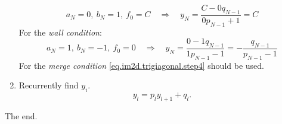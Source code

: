 \documentclass[a4paper,10pt]{article}
\begin{document}
\begin{enumerate}
\begin{equation}
        a_N = 0,\ b_N = 1,\ f_0 = C
        \quad\Rightarrow\quad
        y_N = \frac{C - 0 q_{N-1}}{0 p_{N-1} + 1} = C
    \end{equation}
    For the \emph{wall condition}:
    \begin{equation}
        a_N = 1,\ b_N = -1,\ f_0 = 0
        \quad\Rightarrow\quad
        y_N = \frac{0 - 1 q_{N-1}}{1 p_{N-1} - 1} = -\frac{q_{N-1}}{p_{N-1} - 1}
    \end{equation}
    For the \emph{merge condition} \eqref{eq.im2d.trigiagonal.step4}
    should be used.
  \item Recurrently find $y_i$.
    \begin{equation}\label{eq.im2d.trigiagonal.step4}
        y_l = p_l y_{l+1} + q_l.
    \end{equation}
\end{enumerate}

The end.







\end{document}
